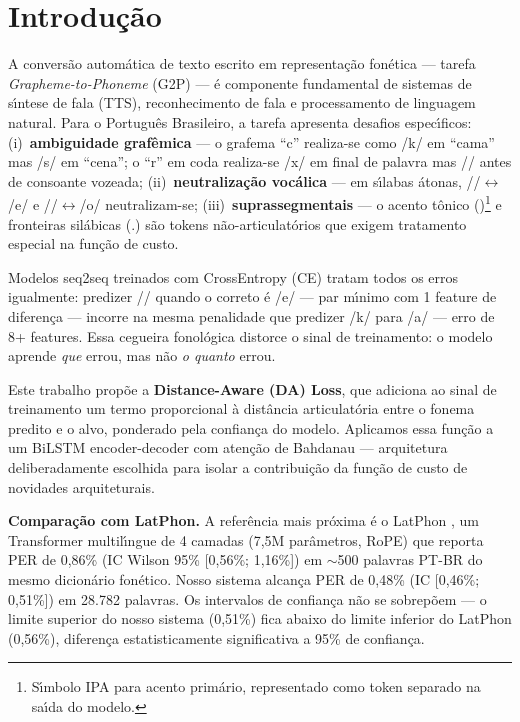 \documentclass[12pt]{article}
\newcommand{\ipaE}{\textipa{E}}%
\newcommand{\ipaO}{\textipa{O}}%
\newcommand{\ipaG}{\textipa{G}}%
\begin{document}
\section{Introdu\c{c}\~ao}

A convers\~ao autom\'atica de texto escrito em representa\c{c}\~ao
fon\'etica --- tarefa \emph{Grapheme-to-Phoneme} (G2P) --- \'e componente
fundamental de sistemas de s\'{\i}ntese de fala (TTS), reconhecimento de
fala e processamento de linguagem natural. Para o Portugu\^es Brasileiro,
a tarefa apresenta desafios espec\'{\i}ficos:
(i)~\textbf{ambiguidade graf\^emica} --- o grafema ``c'' realiza-se como
/k/ em ``cama'' mas /s/ em ``cena''; o ``r'' em coda realiza-se /x/ em
final de palavra mas /\ipaG{}/ antes de consoante vozeada;
(ii)~\textbf{neutraliza\c{c}\~ao voc\'alica} --- em s\'{\i}labas \'atonas,
/\ipaE{}/$\leftrightarrow$/e/ e /\ipaO{}/$\leftrightarrow$/o/
neutralizam-se; (iii)~\textbf{suprassegmentais} --- o acento t\^onico
(\textsuperscript{\textprimstress})\footnote{S\'{\i}mbolo IPA para acento prim\'ario,
representado como token separado na sa\'{\i}da do modelo.} e fronteiras
sil\'abicas (.) s\~ao tokens n\~ao-articulat\'orios que exigem tratamento
especial na fun\c{c}\~ao de custo.

Modelos seq2seq treinados com CrossEntropy (CE) tratam todos os erros
igualmente: predizer /\ipaE{}/ quando o correto \'e /e/ --- par
m\'{\i}nimo com 1 feature de diferen\c{c}a --- incorre na mesma
penalidade que predizer /k/ para /a/ --- erro de 8+ features. Essa
cegueira fonol\'ogica distorce o sinal de treinamento: o modelo aprende
\emph{que} errou, mas n\~ao \emph{o quanto} errou.

Este trabalho prop\~oe a \textbf{Distance-Aware (DA) Loss}, que adiciona
ao sinal de treinamento um termo proporcional \`a dist\^ancia
articulat\'oria entre o fonema predito e o alvo, ponderado pela
confian\c{c}a do modelo. Aplicamos essa fun\c{c}\~ao a um BiLSTM
encoder-decoder com aten\c{c}\~ao de Bahdanau
\cite{bahdanau2014neural} --- arquitetura deliberadamente escolhida para
isolar a contribui\c{c}\~ao da fun\c{c}\~ao de custo de novidades
arquiteturais.

\textbf{Compara\c{c}\~ao com LatPhon.} A refer\^encia mais pr\'oxima \'e
o LatPhon \cite{chary2025latphon}, um Transformer multil\'{\i}ngue de 4
camadas (7,5M par\^ametros, RoPE) que reporta PER de 0,86\% (IC Wilson
95\% [0,56\%; 1,16\%]) em ${\sim}$500 palavras PT-BR do mesmo dicion\'ario
fon\'etico. Nosso sistema alcan\c{c}a PER de 0,48\% (IC [0,46\%; 0,51\%])
em 28.782 palavras. Os intervalos de confian\c{c}a n\~ao se
sobrep\~oem --- o limite superior do nosso sistema (0,51\%) fica abaixo
do limite inferior do LatPhon (0,56\%), diferen\c{c}a estatisticamente
significativa a 95\% de confian\c{c}a.
\end{document}
